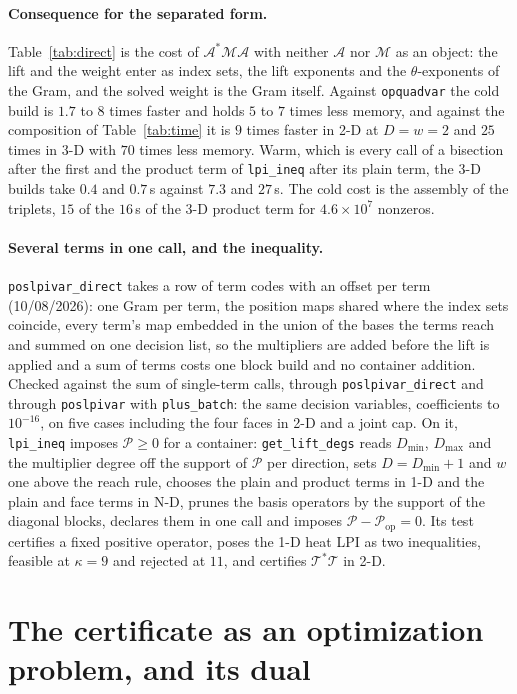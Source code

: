 \documentclass[12pt]{article}
\newcommand{\mcl}[1]{\mathcal{#1}}
\newcommand{\code}[1]{\texttt{#1}}
\theoremstyle{plain}
\theoremstyle{definition}
\theoremstyle{remark}
\begin{document}
\paragraph{Consequence for the separated form.} Table~\ref{tab:direct} is the cost of $\mcl A^*\mcl M\mcl A$ with neither $\mcl A$ nor $\mcl M$ as an object: the lift and the weight enter as index sets, the lift exponents and the $\theta$-exponents of the Gram, and the solved weight is the Gram itself. Against \code{opquadvar} the cold build is $1.7$ to $8$ times faster and holds $5$ to $7$ times less memory, and against the composition of Table~\ref{tab:time} it is $9$ times faster in 2-D at $D=w=2$ and $25$ times in 3-D with $70$ times less memory. Warm, which is every call of a bisection after the first and the product term of \code{lpi\_ineq} after its plain term, the 3-D builds take $0.4$ and $0.7$\,s against $7.3$ and $27$\,s. The cold cost is the assembly of the triplets, $15$ of the $16$\,s of the 3-D product term for $4.6\times10^{7}$ nonzeros.

\paragraph{Several terms in one call, and the inequality.} \code{poslpivar\_direct} takes a row of term codes with an offset per term (10/08/2026): one Gram per term, the position maps shared where the index sets coincide, every term's map embedded in the union of the bases the terms reach and summed on one decision list, so the multipliers are added before the lift is applied and a sum of terms costs one block build and no container addition. Checked against the sum of single-term calls, through \code{poslpivar\_direct} and through \code{poslpivar} with \code{plus\_batch}: the same decision variables, coefficients to $10^{-16}$, on five cases including the four faces in 2-D and a joint cap. On it, \code{lpi\_ineq} imposes $\mcl P\ge0$ for a container: \code{get\_lift\_degs} reads $D_{\min}$, $D_{\max}$ and the multiplier degree off the support of $\mcl P$ per direction, sets $D=D_{\min}+1$ and $w$ one above the reach rule, chooses the plain and product terms in 1-D and the plain and face terms in N-D, prunes the basis operators by the support of the diagonal blocks, declares them in one call and imposes $\mcl P-\mcl P_{\mathrm{op}}=0$. Its test certifies a fixed positive operator, poses the 1-D heat LPI as two inequalities, feasible at $\kappa=9$ and rejected at $11$, and certifies $\mcl T^*\mcl T$ in 2-D.

\section{The certificate as an optimization problem, and its dual}\label{sec:dual}
\end{document}
